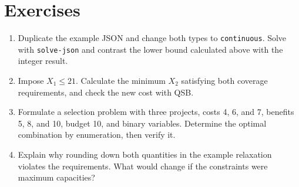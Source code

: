 \section{Exercises}
\begin{enumerate}
 \item Duplicate the example JSON and change both types to
 \texttt{continuous}. Solve with \texttt{solve-json} and contrast the lower
 bound calculated above with the integer result.
 \item Impose \(X_1\leq21\). Calculate the minimum \(X_2\) satisfying both
 coverage requirements, and check the new cost with QSB.
 \item Formulate a selection problem with three projects, costs 4, 6, and 7,
 benefits 5, 8, and 10, budget 10, and binary variables. Determine the optimal
 combination by enumeration, then verify it.
 \item Explain why rounding down both quantities in the example relaxation
 violates the requirements. What would change if the constraints were maximum
 capacities?
\end{enumerate}
